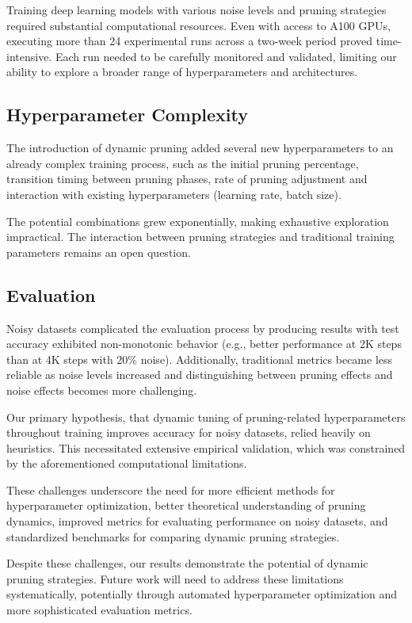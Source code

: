 \documentclass{article}
\begin{document}
Training deep learning models with various noise levels and pruning strategies required substantial computational resources. Even with access to A100 GPUs, executing more than 24 experimental runs across a two-week period proved time-intensive. Each run needed to be carefully monitored and validated, limiting our ability to explore a broader range of hyperparameters and architectures.

\subsection{Hyperparameter Complexity}

The introduction of dynamic pruning added several new hyperparameters to an already complex training process, such as the initial pruning percentage, transition timing between pruning phases, rate of pruning adjustment and interaction with existing hyperparameters (learning rate, batch size).

The potential combinations grew exponentially, making exhaustive exploration impractical. The interaction between pruning strategies and traditional training parameters remains an open question.

\subsection{Evaluation}

Noisy datasets complicated the evaluation process by producing results with test accuracy exhibited non-monotonic behavior (e.g., better performance at 2K steps than at 4K steps with 20\% noise). Additionally, traditional metrics became less reliable as noise levels increased and distinguishing between pruning effects and noise effects becomes more challenging.

Our primary hypothesis, that dynamic tuning of pruning-related hyperparameters throughout training improves accuracy for noisy datasets, relied heavily on heuristics. This necessitated extensive empirical validation, which was constrained by the aforementioned computational limitations.

These challenges underscore the need for more efficient methods for hyperparameter optimization, better theoretical understanding of pruning dynamics, improved metrics for evaluating performance on noisy datasets, and standardized benchmarks for comparing dynamic pruning strategies.

Despite these challenges, our results demonstrate the potential of dynamic pruning strategies. Future work will need to address these limitations systematically, potentially through automated hyperparameter optimization and more sophisticated evaluation metrics.
\end{document}
